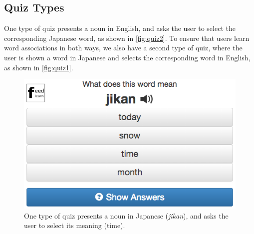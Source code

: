 \documentclass{sigchi}
\begin{document}




\pagebreak

\subsection{Quiz Types}

One type of quiz presents a noun in English, and asks the user to select the corresponding Japanese word, as shown in \autoref{fig:quiz2}. To ensure that users learn word associations in both ways, we also have a second type of quiz, where the user is shown a word in Japanese and selects the corresponding word in English, as shown in \autoref{fig:quiz1}.

\begin{figure}
\centering
\includegraphics[width=1.0\columnwidth]{quiz1}
\caption{One type of quiz presents a noun in Japanese (\textit{jikan}), and asks the user to select its meaning (time).}
\label{fig:quiz1}
\end{figure}
\end{document}
